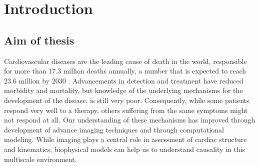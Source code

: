 \chapter{Introduction}







\section{Aim of thesis}
Cardiovascular diseases are the leading cause of death in the
world, responsible for more than 17.3 million deaths annually, a
number that is expected to reach 23.6 million by 2030
\cite{writing2016heart}. Advancements in detection and treatment
have reduced morbidity and mortality, but knowledge of the underlying
mechanisms for the development of the disease, is still very poor.
Consequently, while some patients respond very well to a therapy, others suffering
from the same symptoms might not respond at all.
Our understanding of these mechanisms has improved through
development of advance imaging techniques and through
computational modeling. While imaging plays a central role in
assessment of cardiac structure and kinematics, biophysical models can
help us to understand causality in this multiscale environment.  



